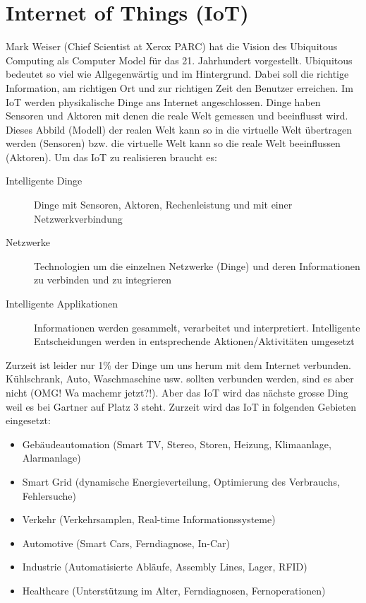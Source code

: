 \section{Internet of Things (IoT)}

Mark Weiser (Chief Scientist at Xerox PARC) hat die Vision des Ubiquitous Computing als Computer Model für das 21. Jahrhundert vorgestellt. Ubiquitous bedeutet so viel wie Allgegenwärtig und im Hintergrund. Dabei soll die richtige Information, am richtigen Ort und zur richtigen Zeit den Benutzer erreichen. Im IoT werden physikalische Dinge ans Internet angeschlossen. Dinge haben Sensoren und Aktoren mit denen die reale Welt gemessen und beeinflusst wird. Dieses Abbild (Modell) der realen Welt kann so in die virtuelle Welt übertragen werden (Sensoren) bzw. die virtuelle Welt kann so die reale Welt beeinflussen (Aktoren). Um das IoT zu realisieren braucht es:
\begin{description}
	\item[Intelligente Dinge] Dinge mit Sensoren, Aktoren, Rechenleistung und mit einer Netzwerkverbindung
	\item[Netzwerke] Technologien um die einzelnen Netzwerke (Dinge) und deren Informationen zu verbinden und zu integrieren
	\item[Intelligente Applikationen] Informationen werden gesammelt, verarbeitet und interpretiert. Intelligente Entscheidungen werden in entsprechende Aktionen/Aktivitäten umgesetzt
\end{description}
Zurzeit ist leider nur 1\% der Dinge um uns herum mit dem Internet verbunden. Kühlschrank, Auto, Waschmaschine usw. sollten verbunden werden, sind es aber nicht (OMG! Wa machemr jetzt?!). Aber das IoT wird das nächste grosse Ding weil es bei Gartner auf Platz 3 steht. Zurzeit wird das IoT in folgenden Gebieten eingesetzt:
\begin{itemize}
	\item Gebäudeautomation (Smart TV, Stereo, Storen, Heizung, Klimaanlage, Alarmanlage)
	\item Smart Grid (dynamische Energieverteilung, Optimierung des Verbrauchs, Fehlersuche)
	\item Verkehr (Verkehrsamplen, Real-time Informationssysteme)
	\item Automotive (Smart Cars, Ferndiagnose, In-Car)
	\item Industrie (Automatisierte Abläufe, Assembly Lines, Lager, RFID)
	\item Healthcare (Unterstützung im Alter, Ferndiagnosen, Fernoperationen)
\end{itemize}
